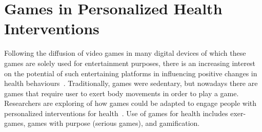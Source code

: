 \section{Games in Personalized Health Interventions}
Following the diffusion of video games in many digital devices of which these games are solely used for entertainment purposes, there is an increasing interest on the potential of such entertaining platforms in influencing positive changes in health behaviours~\citep{king2013gamification}. Traditionally, games were sedentary, but nowadays there are games that require user to exert body movements in order to play a game. Researchers are exploring of how games could be adapted to engage people with personalized interventions for health~\citep{mccallum2012gamification}. Use of games for health includes exer-games, games with purpose (serious games), and gamification.
